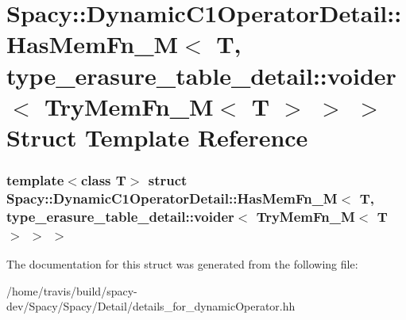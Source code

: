 \hypertarget{structSpacy_1_1DynamicC1OperatorDetail_1_1HasMemFn__M_3_01T_00_01type__erasure__table__detail_1_08a26e1a59bf940c27e994bcdb1fcb00}{\section{\-Spacy\-:\-:\-Dynamic\-C1\-Operator\-Detail\-:\-:\-Has\-Mem\-Fn\-\_\-\-M$<$ \-T, type\-\_\-erasure\-\_\-table\-\_\-detail\-:\-:voider$<$ \-Try\-Mem\-Fn\-\_\-\-M$<$ \-T $>$ $>$ $>$ \-Struct \-Template \-Reference}
\label{structSpacy_1_1DynamicC1OperatorDetail_1_1HasMemFn__M_3_01T_00_01type__erasure__table__detail_1_08a26e1a59bf940c27e994bcdb1fcb00}
}
\subsubsection*{template$<$class T$>$ struct Spacy\-::\-Dynamic\-C1\-Operator\-Detail\-::\-Has\-Mem\-Fn\-\_\-\-M$<$ T, type\-\_\-erasure\-\_\-table\-\_\-detail\-::voider$<$ Try\-Mem\-Fn\-\_\-\-M$<$ T $>$ $>$ $>$}



\-The documentation for this struct was generated from the following file\-:\begin{DoxyCompactItemize}
\item 
/home/travis/build/spacy-\/dev/\-Spacy/\-Spacy/\-Detail/details\-\_\-for\-\_\-dynamic\-Operator.\-hh\end{DoxyCompactItemize}

